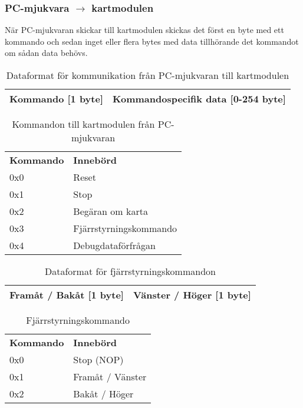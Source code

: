\subsubsection{PC-mjukvara $\rightarrow$ kartmodulen}
När PC-mjukvaran skickar till kartmodulen skickas det först en byte med ett
kommando och sedan inget eller flera bytes med data tillhörande det kommandot
om sådan data behövs.

\begin{table}[H]
	\caption{Dataformat för kommunikation från PC-mjukvaran till
	kartmodulen}
	\begin{center}
	\begin{tabular}{| c | c |} \hline
		Kommando [1 byte] & Kommandospecifik data [0-254 byte] \\ \hline
	\end{tabular}
	\end{center}
\end{table}

\begin{table}[H]
	\caption{Kommandon till kartmodulen från PC-mjukvaran}
	\begin{tabular}{l l}
		\textbf{Kommando} & \textbf{Innebörd} \\
		0x0	& 	Reset \\
		0x1	&	Stop \\
		0x2 	&	Begäran om karta \\
		0x3	&	Fjärrstyrningskommando \\
		0x4	&	Debugdataförfrågan \\
	\end{tabular}
\end{table}

\begin{table}[H]
	\caption{Dataformat för fjärrstyrningskommandon}
	\begin{center}
	\begin{tabular}{| c | c |} \hline
		Framåt / Bakåt [1 byte] & Vänster / Höger [1 byte] \\ \hline
	\end{tabular}
	\end{center}
\end{table}

\begin{table}[H]
	\caption{Fjärrstyrningskommando}
	\begin{tabular}{l l}
		\textbf{Kommando} & \textbf{Innebörd} \\
		0x0	&	Stop (NOP) \\
		0x1	&	Framåt / Vänster \\
		0x2	&	Bakåt / Höger \\
	\end{tabular}
\end{table}

